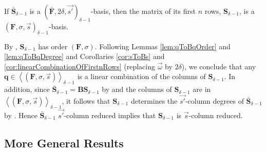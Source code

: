 \begin{lem}
\label{lem:delta-1Basis} If $\bar{\mathbf{S}}_{\delta-1}$ is a $(\bar{\mathbf{F}},2\delta,\vec{s'})_{\delta-1}$-basis,
then the matrix of its first $n$ rows, $\mathbf{S}_{\delta-1}$,
is a $\left(\mathbf{F},\sigma,\vec{s}\right)_{\delta-1}$-basis.\end{lem}
\begin{pf}
By , $\mathbf{S}_{\delta-1}$ has order
$\left(\mathbf{F},\sigma\right)$. Following Lemmas \ref{lem:qToBqOrder}
and \ref{lem:qToBqDegree} and Corollaries \ref{cor:sToBs} and \ref{cor:linearCombinationOfFirstnRows}
(replacing $\vec{\omega}$ by $2\delta$), we conclude that any $\mathbf{q}\in\left\langle \left(\mathbf{F},\sigma,\vec{s}\right)\right\rangle _{\delta-1}$
is a linear combination of the columns of $\mathbf{S}_{\delta-1}$.
In addition, since $\bar{\mathbf{S}}_{\delta-1}=\mathbf{B}\mathbf{S}_{\delta-1}$
by  and the columns of $\mathbf{S}_{\delta-1}$
are in $\left\langle \left(\mathbf{F},\sigma,\vec{s}\right)\right\rangle _{\delta-1}$,
it follows that $\mathbf{S}_{\delta-1}$ determines the $\vec{s'}$-column
degrees of $\bar{\mathbf{S}}_{\delta-1}$ by .
Hence $\bar{\mathbf{S}}_{\delta-1}$ $\vec{s'}$-column reduced implies
that $\mathbf{S}_{\delta-1}$ is $\vec{s}$-column reduced. 
\end{pf}

\subsection{\label{sub:generalTransform}More General Results}


